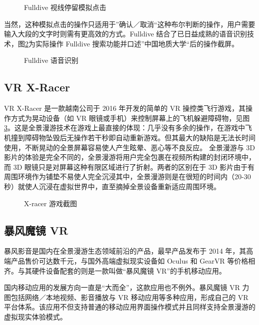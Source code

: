 \begin{figure}[htp]
\centering
{}
\caption{Fulldive 视线停留模拟点击}
\label{fig:fulldive3}
\end{figure}

当然，这种模拟点击的操作只适用于”确认／取消“这种布尔判断的操作，用户需要输入大段的文字时则需有更高效的方式。Fulldive 结合了已日益成熟的语音识别技术，图\ref{fig:fulldive4}为实际操作 Fulldive 搜索功能并口述”中国地质大学“后的操作截屏。

\begin{figure}[htp]
\centering
{}
\caption{Fulldive 语音识别}
\label{fig:fulldive4}
\end{figure}

\subsection{VR X-Racer}

VR X-Racer 是一款越南公司于 2016 年开发的简单的 VR 操控类飞行游戏，其操作方式为晃动设备（如 VR 眼镜或手机）来控制屏幕上的飞机躲避障碍物，见图\ref{fig:x-racer}。这是全景漫游技术在游戏上最直接的体现：几乎没有多余的操作，在游戏中飞机撞到障碍物坠毁后无操作若干秒即自动重新游戏。但其最大的缺陷是无法长时间使用，不断晃动的全景屏幕容易使人产生眩晕、恶心等不良反应。
全景漫游与 3D 影片的体验是完全不同的，全景漫游将用户完全包裹在视频所构建的封闭环境中，而 3D 眼镜只是对屏幕这种有限区域进行了折射。两者的区别在于 3D 影片由于有周围环境作为铺垫不易使人完全沉浸其中，全景漫游则是在很短的时间内（20-30 秒）就使人沉浸在虚拟世界中，直至摘掉全景设备重新适应周围环境。

\begin{figure}[htp]
\centering
{}
\caption{X-racer 游戏截图}
\label{fig:x-racer}
\end{figure}

\subsection{暴风魔镜 VR}

暴风影音是国内在全景漫游生态领域前沿的产品，最早产品发布于 2014 年，其高端产品售价可达数千元，与国外高端虚拟现实设备如 Oculus 和 GearVR 等价格相齐。与其硬件设备配套的则是一款叫做“暴风魔镜 VR”的手机移动应用。

国内移动应用的发展方向一直是“大而全”，这款应用也不例外。暴风魔镜 VR 力图包括网络／本地视频、影音播放与 VR 移动应用等多种应用，形成自己的 VR 平台体系。该应用不但支持普通的移动应用界面操作模式并且同样支持全景漫游的虚拟现实体验模式。

